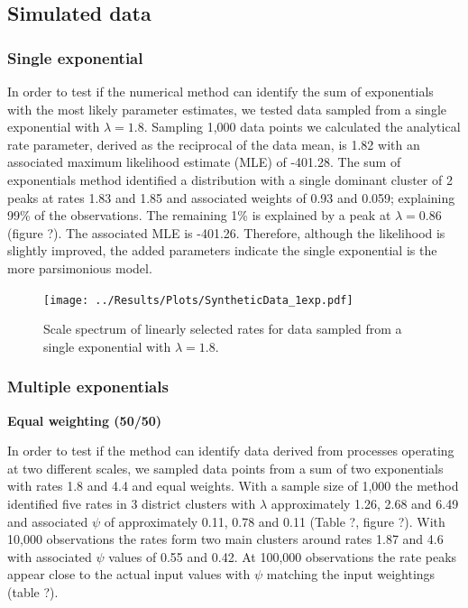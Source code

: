 \documentclass[11pt,usenames,dvipsnames]{article}
\begin{document}
\noindent
\subsection{Simulated data}

\subsubsection{Single exponential}
In order to test if the numerical method can identify the sum of exponentials with the most likely parameter estimates, we tested data sampled from a single exponential with $\lambda = 1.8$. Sampling 1,000 data points we calculated the analytical rate parameter, derived as the reciprocal of the data mean, is 1.82 with an associated maximum likelihood estimate (MLE) of -401.28. The sum of exponentials method identified a distribution with a single dominant cluster of 2 peaks at rates 1.83 and 1.85 and associated weights of 0.93 and 0.059; explaining 99\% of the observations. The remaining 1\% is explained by a peak at $\lambda = 0.86$ (figure ?). The associated MLE is -401.26. Therefore, although the likelihood is slightly improved, the added parameters indicate the single exponential is the more parsimonious model.

\begin{figure}[H]
	\centering
	\texttt{[image: ../Results/Plots/SyntheticData\_1exp.pdf]}
	\caption{Scale spectrum of linearly selected rates for data sampled from a single exponential with $\lambda = 1.8$.}
\end{figure}


\subsubsection{Multiple exponentials}

\noindent
\textbf{Equal weighting (50/50)}

In order to test if the method can identify data derived from processes operating at two different scales, we sampled data points from a sum of two exponentials with rates 1.8 and 4.4 and equal weights. With a sample size of 1,000 the method identified five rates in 3 district clusters with $\lambda$ approximately 1.26, 2.68 and 6.49 and associated $\psi$ of approximately 0.11, 0.78 and 0.11 (Table ?, figure ?). With 10,000 observations the rates form two main clusters around rates 1.87 and 4.6 with associated $\psi$ values of 0.55 and 0.42. At 100,000 observations the rate peaks appear close to the actual input values with $\psi$ matching the input weightings (table ?). 
\end{document}
